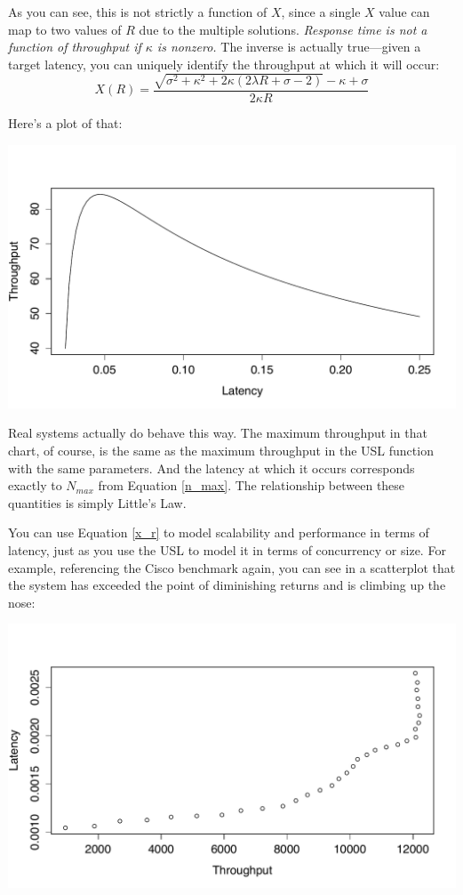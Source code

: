 \documentclass{vivid_layout}
\begin{document}

As you can see, this is not strictly a function of $X$, since a single $X$ value
can map to two values of $R$ due to the multiple solutions. {\itshape Response
time is not a function of throughput if $\kappa$ is nonzero.} The inverse is
actually true---given a target latency, you can uniquely identify the throughput
at which it will occur:
\begin{equation}
X(R)=\frac{\sqrt{\sigma^2+\kappa^2+2\kappa(2\lambda R+\sigma-2)}-\kappa+\sigma}{2\kappa R}
\label{x_r}
\end{equation}

Here's a plot of that:
\begin{center}
\includegraphics[width=.85\linewidth]{scalability/x-function-r}
\end{center}

Real systems actually do behave this way. The maximum throughput in that chart,
of course, is the same as the maximum throughput in the USL function with the
same parameters. And the latency at which it occurs corresponds exactly to
$N_{max}$ from Equation \ref{n_max}. The relationship between these quantities
is simply Little's Law.

You can use Equation \ref{x_r} to model scalability and performance in terms of
latency, just as you use the USL to model it in terms of concurrency or size.
For example, referencing the Cisco benchmark again, you can see in a
scatterplot that the system has exceeded the point of diminishing returns and is
climbing up the nose:
\begin{center}
\includegraphics[width=.85\linewidth]{scalability/not-a-function}
\end{center}
\end{document}
